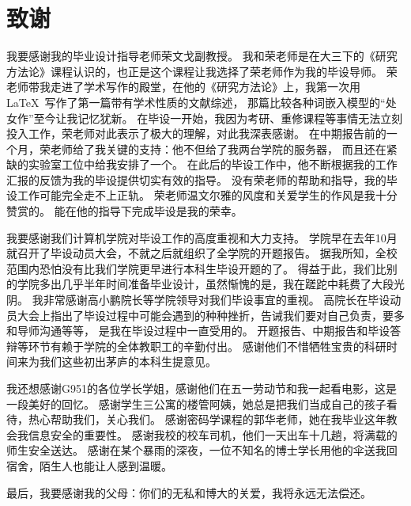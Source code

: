 \chapter*{致谢}
我要感谢我的毕业设计指导老师荣文戈副教授。
我和荣老师是在大三下的《研究方法论》课程认识的，也正是这个课程让我选择了荣老师作为我的毕设导师。
荣老师带我走进了学术写作的殿堂，在他的《研究方法论》上，我第一次用\LaTeX\ 写作了第一篇带有学术性质的文献综述，
那篇比较各种词嵌入模型的“处女作”至今让我记忆犹新。
在毕设一开始，我因为考研、重修课程等事情无法立刻投入工作，荣老师对此表示了极大的理解，对此我深表感谢。
在中期报告前的一个月，荣老师给了我关键的支持：他不但给了我两台学院的服务器，
而且还在紧缺的实验室工位中给我安排了一个。
在此后的毕设工作中，他不断根据我的工作汇报的反馈为我的毕设提供切实有效的指导。
没有荣老师的帮助和指导，我的毕设工作可能完全走不上正轨。
荣老师温文尔雅的风度和关爱学生的作风是我十分赞赏的。
能在他的指导下完成毕设是我的荣幸。

我要感谢我们计算机学院对毕设工作的高度重视和大力支持。
学院早在去年10月就召开了毕设动员大会，不就之后就组织了全学院的开题报告。
据我所知，全校范围内恐怕没有比我们学院更早进行本科生毕设开题的了。
得益于此，我们比别的学院多出几乎半年时间准备毕业设计，虽然惭愧的是，我在蹉跎中耗费了大段光阴。
我非常感谢高小鹏院长等学院领导对我们毕设事宜的重视。
高院长在毕设动员大会上指出了毕设过程中可能会遇到的种种挫折，告诫我们要对自己负责，要多和导师沟通等等，
是我在毕设过程中一直受用的。
开题报告、中期报告和毕设答辩等环节有赖于学院的全体教职工的辛勤付出。
感谢他们不惜牺牲宝贵的科研时间来为我们这些初出茅庐的本科生提意见。

我还想感谢G951的各位学长学姐，感谢他们在五一劳动节和我一起看电影，这是一段美好的回忆。
感谢学生三公寓的楼管阿姨，她总是把我们当成自己的孩子看待，热心帮助我们，关心我们。
感谢密码学课程的郭华老师，她在我毕业这年教会我信息安全的重要性。
感谢我校的校车司机，他们一天出车十几趟，将满载的师生安全送达。
感谢在某个暴雨的深夜，一位不知名的博士学长用他的伞送我回宿舍，陌生人也能让人感到温暖。

最后，我要感谢我的父母：你们的无私和博大的关爱，我将永远无法偿还。
\cleardoublepage
